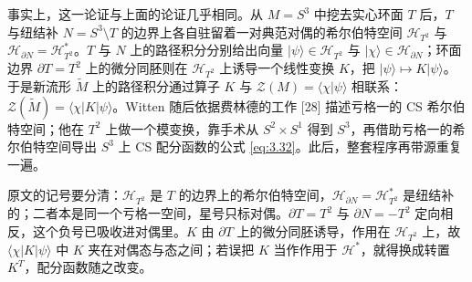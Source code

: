 事实上，这一论证与上面的论证几乎相同。从 $M=S^3$ 中挖去实心环面 $T$ 后，$T$ 与纽结补 $N=S^3\setminus T$ 的边界上各自驻留着一对典范对偶的希尔伯特空间 $\mathcal{H}_{T^2}$ 与 $\mathcal{H}_{\partial N}=\mathcal{H}^{*}_{T^2}$。$T$ 与 $N$ 上的路径积分分别给出向量 $|\psi\rangle\in\mathcal{H}_{T^2}$ 与 $|\chi\rangle\in\mathcal{H}_{\partial N}$；环面边界 $\partial T=T^2$ 上的微分同胚则在 $\mathcal{H}_{T^2}$ 上诱导一个线性变换 $K$，把 $|\psi\rangle\mapsto K|\psi\rangle$。于是新流形 $\widetilde{M}$ 上的路径积分通过算子 $K$ 与 $\mathcal{Z}(M)=\langle\chi|\psi\rangle$ 相联系：$\mathcal{Z}(\widetilde{M})=\langle\chi|K|\psi\rangle$。Witten 随后依据费林德的工作 [28] 描述亏格一的 CS 希尔伯特空间；他在 $T^2$ 上做一个模变换，靠手术从 $S^2\times S^1$ 得到 $S^3$，再借助亏格一的希尔伯特空间导出 $S^3$ 上 CS 配分函数的公式 \eqref{eq:3.32}。此后，整套程序再带源重复一遍。

\begin{yizhu}[易错点]
原文的记号要分清：$\mathcal{H}_{T^2}$ 是 $T$ 的边界上的希尔伯特空间，$\mathcal{H}_{\partial N}=\mathcal{H}^{*}_{T^2}$ 是纽结补的；二者本是同一个亏格一空间，星号只标对偶。$\partial T=T^2$ 与 $\partial N=-T^2$ 定向相反，这个负号已吸收进对偶里。$K$ 由 $\partial T$ 上的微分同胚诱导，作用在 $\mathcal{H}_{T^2}$ 上，故 $\langle\chi|K|\psi\rangle$ 中 $K$ 夹在对偶态与态之间；若误把 $K$ 当作作用于 $\mathcal{H}^{*}$，就得换成转置 $K^{T}$，配分函数随之改变。
\end{yizhu}

